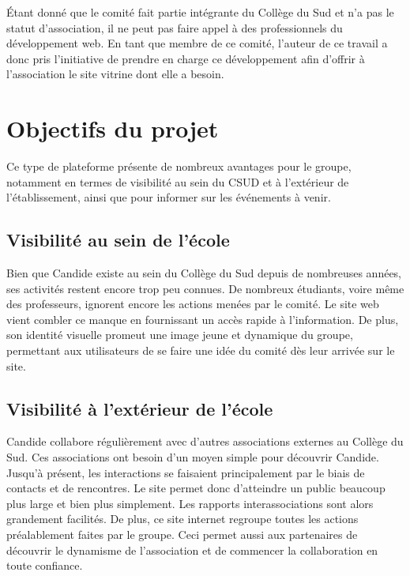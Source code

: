 \documentclass[a4,10pt,french]{sphinxmanual}
\begin{document}
\sphinxAtStartPar
Étant donné que le comité fait partie intégrante du Collège du Sud et n’a pas le statut d’association, il ne peut pas faire appel à des professionnels du développement web. En tant que membre de ce comité, l’auteur de ce travail a donc pris l’initiative de prendre en charge ce développement afin d’offrir à l’association le site vitrine dont elle a besoin.


\section{Objectifs du projet}
\label{\detokenize{introduction:objectifs-du-projet}}
\sphinxAtStartPar
Ce type de plateforme présente de nombreux avantages pour le groupe, notamment en termes de visibilité au sein du CSUD et à l’extérieur de l’établissement, ainsi que pour informer sur les événements à venir.


\subsection{Visibilité au sein de l’école}
\label{\detokenize{introduction:visibilite-au-sein-de-l-ecole}}
\sphinxAtStartPar
Bien que Candide existe au sein du Collège du Sud depuis de nombreuses années, ses activités restent encore trop peu connues. De nombreux étudiants, voire même des professeurs, ignorent encore les actions menées par le comité. Le site web vient combler ce manque en fournissant un accès rapide à l’information. De plus, son identité visuelle promeut une image jeune et dynamique du groupe, permettant aux utilisateurs de se faire une idée du comité dès leur arrivée sur le site.


\subsection{Visibilité à l’extérieur de l’école}
\label{\detokenize{introduction:visibilite-a-l-exterieur-de-l-ecole}}
\sphinxAtStartPar
Candide collabore régulièrement avec d’autres associations externes au Collège du Sud. Ces associations ont besoin d’un moyen simple pour découvrir Candide. Jusqu’à présent, les interactions se faisaient principalement par le biais de contacts et de rencontres. Le site permet donc d’atteindre un public beaucoup plus large et bien plus simplement. Les rapports inter\sphinxhyphen{}associations sont alors grandement facilités. De plus, ce site internet regroupe toutes les actions préalablement faites par le groupe. Ceci permet aussi aux partenaires  de découvrir le dynamisme de l’association et de commencer la collaboration en toute confiance.
\end{document}
